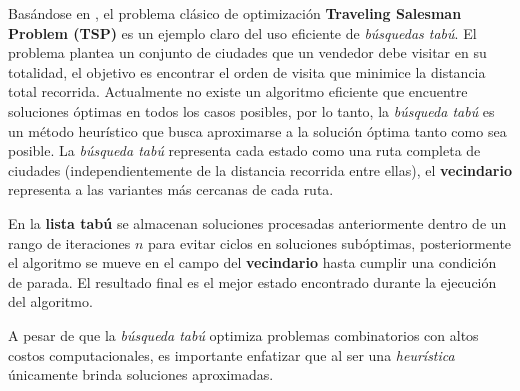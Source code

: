 \begin{example}
    Basándose en \parencite{Gendreau2003}, el problema clásico de optimización \textbf{Traveling Salesman Problem (TSP)} es un ejemplo claro del uso eficiente de \textit{búsquedas tabú}.
    El problema plantea un conjunto de ciudades que un vendedor debe visitar en su totalidad, el objetivo es encontrar el orden de visita que minimice la distancia total recorrida. Actualmente no existe un algoritmo eficiente que encuentre soluciones óptimas en todos los casos posibles, por lo tanto, la \textit{búsqueda tabú} es un método heurístico que busca aproximarse a la solución óptima tanto como sea posible.
    La \textit{búsqueda tabú} representa cada estado como una ruta completa de ciudades (independientemente de la distancia recorrida entre ellas), el \textbf{vecindario} representa a las variantes más cercanas de cada ruta.

    En la \textbf{lista tabú} se almacenan soluciones procesadas anteriormente dentro de un rango de iteraciones $n$ para evitar ciclos en soluciones subóptimas, posteriormente el algoritmo se mueve en el campo del \textbf{vecindario} hasta cumplir una condición de parada. El resultado final es el mejor estado encontrado durante la ejecución del algoritmo.
\end{example}

A pesar de que la \textit{búsqueda tabú} optimiza problemas combinatorios con altos costos computacionales, es importante enfatizar que al ser una \textit{heurística} únicamente brinda soluciones aproximadas.